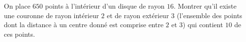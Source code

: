 On place $650$ points à l'intérieur d'un disque de rayon $16$. Montrer
qu'il existe une couronne de rayon intérieur $2$ et de rayon extérieur $3$
(l'ensemble des points dont la distance à un centre donné est comprise entre
$2$ et $3$) qui contient $10$ de ces points.
